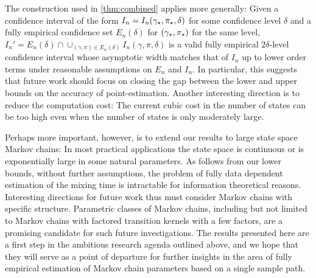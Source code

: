 The construction used in \cref{thm:combined} applies more generally:
Given a confidence interval of the form $I_n = I_n(\gamma_{\star},\pi_{\star},\delta)$ 
for some confidence level $\delta$
and a fully empirical confidence set $E_n(\delta)$ for $(\gamma_{\star},\pi_{\star})$  for the same level,
$I_n' = E_n(\delta) \cap \cup_{(\gamma,\pi)\in E_n(\delta)} I_n(\gamma,\pi,\delta)$ is a valid
fully empirical $2\delta$-level confidence interval whose asymptotic width
matches that of $I_n$ up to lower order terms under reasonable assumptions on $E_n$ and $I_n$.
In particular, this suggests that future work should focus on 
closing the gap between the lower and upper bounds on the accuracy
of point-estimation. Another interesting direction is to 
reduce the computation cost: The current cubic cost in the number of states
can be too high even when the number of states is only moderately
large.

Perhaps more important, however, is to extend 
our results to large state space Markov chains:
In most practical applications the state space is continuous
or is exponentially large in some natural parameters.
As follows from our lower bounds, without further assumptions,
the problem of fully data dependent estimation of the mixing time
is intractable for information theoretical reasons.
Interesting directions for future work thus must consider Markov
chains with specific structure. Parametric classes of Markov chains,
including but not limited to Markov chains with factored transition kernels
with a few factors, are a promising candidate for such future investigations.
The results presented here are a first step in the ambitious research agenda
outlined above, and we hope that they will
serve as a point of departure
for
further insights
in the area of fully empirical estimation of Markov chain 
parameters based on a single sample path.


